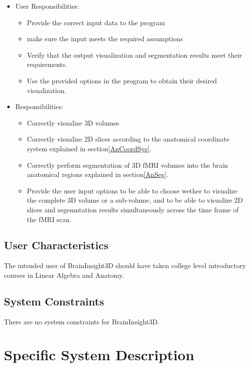 \documentclass[12pt]{article}
\begin{document}
\begin{itemize}
  \item User Responsibilities:
        \begin{itemize}
          \item Provide the correct input data to the program
          \item make sure the input meets the required assumptions
          \item Verify that the output visualization and segmentation
                results meet their requirements.
          \item Use the provided options in the program to obtain their
                desired visualization.
        \end{itemize}
  \item \progname{} Responsibilities:
        \begin{itemize}
          \item Correctly visualize 3D volumes
          \item Correctly visualize 2D slices according to the anatomical
                coordinate system explained in section\ref{AnCoordSys}.
          \item Correctly perform segmentation of 3D fMRI volumes into the brain
                anatomical regions  explained in section\ref{AnSeg}.
          \item Provide the user input options to be able to choose wether to visualize
                the complete 3D volume or a sub-volume, and to be able to visualize 2D slices and
                segemntation results simultaneously across the time frame of the fMRI scan.
        \end{itemize}
\end{itemize}

\subsection{User Characteristics} \label{SecUserCharacteristics}

The intended user of BrainInsight3D should have taken college level introductory
courses in Linear Algebra and Anatomy.

\subsection{System Constraints}
There are no system constraints for BrainInsight3D.

\section{Specific System Description}
\end{document}
